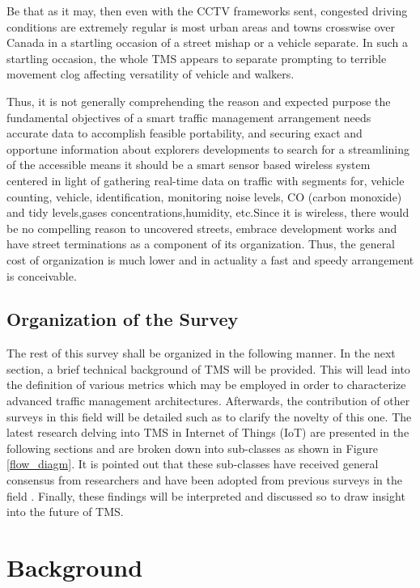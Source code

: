 \documentclass[conference]{IEEEtran}
\begin{document}
 Be that as it may, then even with the CCTV frameworks sent, congested driving conditions are extremely regular is most urban areas and towns crosswise over Canada in a startling occasion of a street mishap or a vehicle separate. In such a startling occasion, the whole TMS appears to separate prompting to terrible movement clog affecting versatility of vehicle and walkers. 
 
 Thus, it is not generally comprehending the reason and expected purpose the fundamental objectives of a smart traffic management arrangement needs accurate data to accomplish feasible portability, and securing exact and opportune information about explorers developments to search for a streamlining of the accessible means it should be a smart sensor based wireless system centered in light of gathering real-time data on traffic with segments for, vehicle counting, vehicle, identification, monitoring noise levels, CO (carbon monoxide) and tidy levels,gases concentrations,humidity, etc.Since it is wireless, there would be no compelling reason to uncovered streets, embrace development works and have street terminations as a component of its organization. Thus, the general cost of organization is much lower and in actuality a fast and speedy arrangement is conceivable.

\subsection{Organization of the Survey}
The rest of this survey shall be organized in the following manner. In the next section, a brief technical background of TMS will be provided. This will lead into the definition of various metrics which may be employed in order to characterize advanced traffic management architectures. Afterwards, the contribution of other surveys in this field will be detailed such as to clarify the novelty of this one. The latest research delving into TMS in Internet of Things (IoT) are presented in the following sections and are broken down into sub-classes as shown in Figure \ref{flow_diagm}. It is pointed out that these sub-classes have received general consensus from researchers and have been adopted from previous surveys in the field \cite{souza:review}. Finally, these findings will be interpreted and discussed so to draw insight into the future of TMS.

\section{Background}
\end{document}
